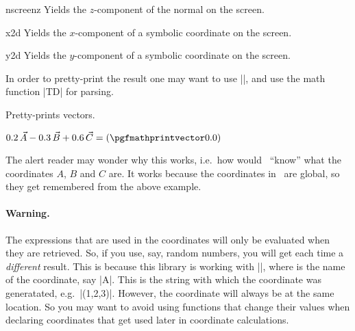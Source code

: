 \documentclass[a4paper,fleqn]{ltxdoc}
\begin{document}
\begin{math-function}{nscreenz}
   Yields the $z$-component of the normal on the screen. 
\end{math-function}

\begin{math-function}{x2d}
   Yields the $x$-component of a symbolic coordinate on the screen. 
\end{math-function}

\begin{math-function}{y2d}
   Yields the $y$-component of a symbolic coordinate on the screen. 
\end{math-function}


In order to pretty-print the result one may want to use |\pgfmathprintvector|,
and use the math function |TD| for parsing.

\begin{command}{\pgfmathprintvector{}}
   Pretty-prints vectors.
\end{command}


\begin{codeexample}[width=6.5cm,preamble={\usetikzlibrary{3dtools}}]
%
$0.2\,\vec A-0.3\,\vec B+0.6\,\vec C
=(\pgfmathprintvector\pgfmathresult)$
\end{codeexample}

The alert reader may wonder why this works, i.e.\ how would \tikzname\ ``know''
what the coordinates $A$, $B$ and $C$ are. It works because the coordinates in
\tikzname\ are global, so they get remembered from the above example.


\paragraph{Warning.} The expressions that are used in the coordinates will only
be evaluated when they are retrieved. So, if you use, say, random numbers, you
will get each time a \emph{different} result. This is because this library is
working with |\tikz@dcl@coord@|, where  is the name of
the coordinate, say |A|. This is the string with which the coordinate was
generatated, e.g.\ |(1,2,3)|. However, the coordinate will always be at the same location. So
you may want to avoid using functions that change their values when declaring
coordinates that get used later in coordinate calculations. 

\begin{codeexample}[width=4.5cm,preamble={\usetikzlibrary{3dtools}}]
\end{codeexample}
\end{document}
